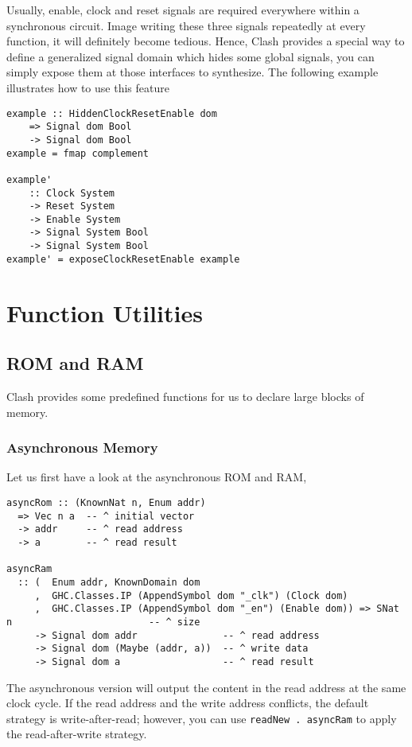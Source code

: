 Usually, enable, clock and reset signals are required everywhere within a synchronous circuit. Image writing these three signals repeatedly at every function, it will definitely become tedious. Hence, Clash provides a special way to define a generalized signal domain which hides some global signals, you can simply expose them at those interfaces to synthesize.
The following example illustrates how to use this feature
\begin{verbatim}
example :: HiddenClockResetEnable dom
    => Signal dom Bool
    -> Signal dom Bool
example = fmap complement

example' 
    :: Clock System
    -> Reset System
    -> Enable System
    -> Signal System Bool
    -> Signal System Bool
example' = exposeClockResetEnable example 
\end{verbatim} 

\section{Function Utilities}
\subsection{ROM and RAM}
Clash provides some predefined functions for us to declare large blocks of memory. 
\subsubsection{Asynchronous Memory}
Let us first have a look at the asynchronous ROM and RAM,
\begin{verbatim}
asyncRom :: (KnownNat n, Enum addr) 
  => Vec n a  -- ^ initial vector 
  -> addr     -- ^ read address
  -> a        -- ^ read result         

asyncRam
  :: (  Enum addr, KnownDomain dom
     ,  GHC.Classes.IP (AppendSymbol dom "_clk") (Clock dom)
     ,  GHC.Classes.IP (AppendSymbol dom "_en") (Enable dom)) => SNat n                        -- ^ size
     -> Signal dom addr               -- ^ read address
     -> Signal dom (Maybe (addr, a))  -- ^ write data
     -> Signal dom a                  -- ^ read result
\end{verbatim}
The asynchronous version will output the content in the read address at the same clock cycle. If the read address and the write address conflicts, the default strategy is write-after-read; however, you can use \texttt{readNew . asyncRam} to apply the read-after-write strategy.

